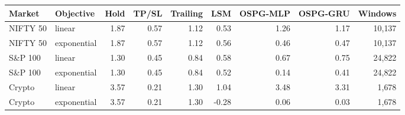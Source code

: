 \begin{tabular}{llrrrrrrr}
\toprule
Market & Objective & Hold & TP/SL & Trailing & LSM & OSPG-MLP & OSPG-GRU & Windows \\
\midrule
NIFTY 50 & linear & 1.87 & 0.57 & 1.12 & 0.53 & 1.26 & 1.17 & 10{,}137 \\
NIFTY 50 & exponential & 1.87 & 0.57 & 1.12 & 0.56 & 0.46 & 0.47 & 10{,}137 \\
S\&P 100 & linear & 1.30 & 0.45 & 0.84 & 0.58 & 0.67 & 0.75 & 24{,}822 \\
S\&P 100 & exponential & 1.30 & 0.45 & 0.84 & 0.52 & 0.14 & 0.41 & 24{,}822 \\
Crypto & linear & 3.57 & 0.21 & 1.30 & 1.04 & 3.48 & 3.31 & 1{,}678 \\
Crypto & exponential & 3.57 & 0.21 & 1.30 & -0.28 & 0.06 & 0.03 & 1{,}678 \\
\bottomrule
\end{tabular}

